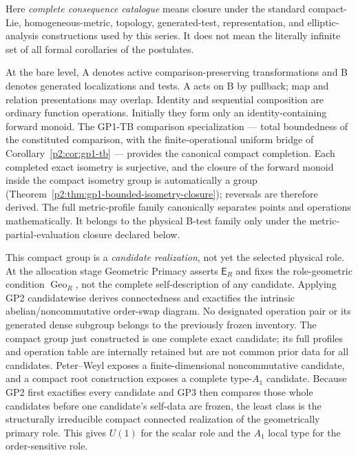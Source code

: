 \documentclass[12pt,a4paper]{article}
\begin{document}
Here \emph{complete consequence catalogue} means closure under the standard
compact-Lie, homogeneous-metric, topology, generated-test, representation, and
elliptic-analysis constructions used by this series.  It does not mean the
literally infinite set of all formal corollaries of the postulates.

At the bare level, A denotes active comparison-preserving transformations and
B denotes generated localizations and tests.  A acts on B by pullback; map and
relation presentations may overlap.  Identity and sequential composition are
ordinary function operations.  Initially they form only an
identity-containing forward monoid.  The GP1-TB comparison specialization
--- total boundedness of the constituted comparison, with the
finite-operational uniform bridge of Corollary~\ref{p2:cor:gp1-tb} ---
provides the canonical compact completion.  Each completed exact isometry is
surjective, and the closure of the forward monoid inside the compact isometry
group is automatically a group
(Theorem~\ref{p2:thm:gp1-bounded-isometry-closure}); reversals are therefore
derived.  The full metric-profile family canonically separates points and operations
mathematically.  It belongs to the physical B-test
family only under the metric-partial-evaluation closure declared below.

This compact group is a \emph{candidate realization}, not yet the selected
physical role.  At the allocation stage Geometric Primacy asserts
\(\mathsf E_R\) and fixes the role-geometric condition
\(\operatorname{Geo}_R\), not the complete self-description of any candidate.
Applying GP2 candidatewise derives connectedness and exactifies the intrinsic
abelian/noncommutative order-swap diagram.  No designated operation pair or
its generated dense subgroup belongs to the previously frozen inventory.  The
compact group just constructed is one complete exact candidate; its full
profiles and operation table are internally retained but are not common prior
data for all candidates.
Peter--Weyl exposes a finite-dimensional noncommutative candidate, and a
compact root construction exposes a complete type-\(A_1\) candidate.  Because
GP2 first exactifies every candidate and GP3 then compares those whole
candidates before one candidate's self-data are frozen, the least class is the
structurally irreducible compact connected realization of the geometrically
primary role.  This gives \(U(1)\) for the scalar role and the \(A_1\) local
type for the order-sensitive role.
\end{document}
